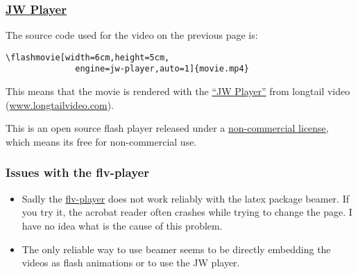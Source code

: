 \documentclass[10pt]{beamer}
\begin{document}
\begin{frame}[fragile]

\frametitle{\href{http://www.longtailvideo.com/players/jw-flv-player}{JW Player}}

The source code used for the video on the previous page is:

\begin{verbatim}
\flashmovie[width=6cm,height=5cm,
              engine=jw-player,auto=1]{movie.mp4}
\end{verbatim}

This means that the movie is rendered with the 
\href{http://www.longtailvideo.com/players/jw-flv-player}{``JW Player''}
from longtail video (\href{http://www.longtailvideo.com}{www.longtailvideo.com}).

\vspace{0.5cm}

This is an open source flash player released under a
\href{http://creativecommons.org/licenses/by-nc-sa/3.0/}{non-commercial license},
which means its free for non-commercial use.

\end{frame}


\begin{frame}[fragile]

\frametitle{Issues with the flv-player}

\begin{itemize}

\item Sadly the \href{http://flv-player.net}{flv-player} does not work 
reliably with the latex package beamer. If you try it, the acrobat reader 
often crashes while trying to change the page. I have no idea 
what is the cause of this problem.

\item The only reliable way to use beamer seems to be directly embedding the videos as
      flash animations or to use the JW player.

\end{itemize}

\end{frame}

\end{document}
